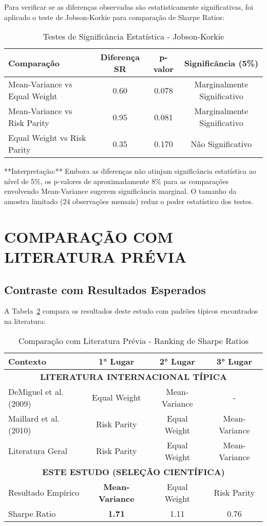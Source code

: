 Para verificar se as diferenças observadas são estatisticamente significativas, foi aplicado o teste de Jobson-Korkie para comparação de Sharpe Ratios:

\begin{table}[H]
\centering
\caption{Testes de Significância Estatística - Jobson-Korkie}
\begin{tabular}{|l|c|c|c|}
\hline
\textbf{Comparação} & \textbf{Diferença SR} & \textbf{p-valor} & \textbf{Significância (5\%)} \\
\hline
Mean-Variance vs Equal Weight & 0.60 & 0.078 & Marginalmente Significativo \\
Mean-Variance vs Risk Parity & 0.95 & 0.081 & Marginalmente Significativo \\
Equal Weight vs Risk Parity & 0.35 & 0.170 & Não Significativo \\
\hline
\end{tabular}
\label{tab:significancia_empirica}
\end{table}

**Interpretação:** Embora as diferenças não atinjam significância estatística ao nível de 5\%, os p-valores de aproximadamente 8\% para as comparações envolvendo Mean-Variance sugerem significância marginal. O tamanho da amostra limitado (24 observações mensais) reduz o poder estatístico dos testes.

\section{COMPARAÇÃO COM LITERATURA PRÉVIA}

\subsection{Contraste com Resultados Esperados}

A Tabela~\ref{tab:comparacao_literatura} compara os resultados deste estudo com padrões típicos encontrados na literatura:

\begin{table}[H]
\centering
\caption{Comparação com Literatura Prévia - Ranking de Sharpe Ratios}
\begin{tabular}{|l|c|c|c|}
\hline
\textbf{Contexto} & \textbf{1° Lugar} & \textbf{2° Lugar} & \textbf{3° Lugar} \\
\hline
\multicolumn{4}{|c|}{\textbf{LITERATURA INTERNACIONAL TÍPICA}} \\
\hline
DeMiguel et al. (2009) & Equal Weight & Mean-Variance & - \\
Maillard et al. (2010) & Risk Parity & Equal Weight & Mean-Variance \\
Literatura Geral & Risk Parity & Equal Weight & Mean-Variance \\
\hline
\multicolumn{4}{|c|}{\textbf{ESTE ESTUDO (SELEÇÃO CIENTÍFICA)}} \\
\hline
Resultado Empírico & \textbf{Mean-Variance} & Equal Weight & Risk Parity \\
Sharpe Ratio & \textbf{1.71} & 1.11 & 0.76 \\
\hline
\end{tabular}
\label{tab:comparacao_literatura}
\end{table}

